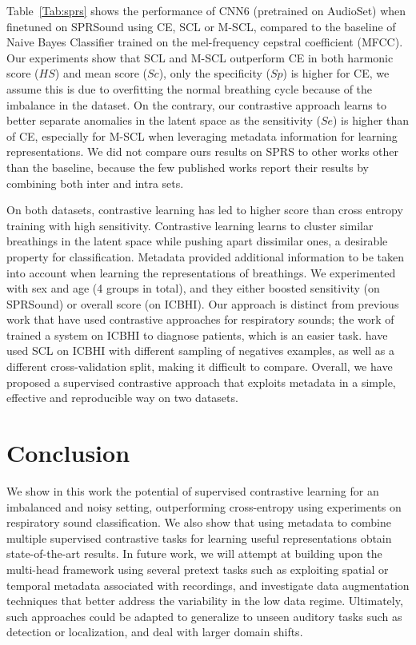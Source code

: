 \documentclass{article}
\begin{document}
\begin{sloppy}
Table~\ref{Tab:sprs} shows the performance of CNN6 (pretrained on AudioSet) when finetuned on SPRSound using CE, SCL or M-SCL, compared to the baseline of Naive Bayes Classifier trained on the mel-frequency cepstral coefficient (MFCC). Our experiments show that SCL and M-SCL outperform CE in both harmonic score ($HS$) and mean score ($Sc$), only the specificity ($Sp$) is higher for CE, we assume this is due to overfitting the normal breathing cycle because of the imbalance in the dataset. On the contrary, our contrastive approach learns to better separate anomalies in the latent space as the sensitivity ($Se$) is higher than of CE, especially for M-SCL when leveraging metadata information for learning representations. We did not compare ours results on SPRS to other works other than the baseline, because the few published works report their results by combining both inter and intra sets.

On both datasets, contrastive learning has led to higher score than cross entropy training with high sensitivity. Contrastive learning learns to cluster similar breathings in the latent space while pushing apart dissimilar ones, a desirable property for classification. Metadata provided additional information to be taken into account when learning the representations of breathings. We experimented with sex and age (4 groups in total), and they either boosted sensitivity (on SPRSound) or overall score (on ICBHI). Our approach is distinct from previous work that have used contrastive approaches for respiratory sounds; the work of~\cite{clhls} trained a system on ICBHI to diagnose patients, which is an easier task. \cite{9414385} have used SCL on ICBHI with different sampling of negatives examples, as well as a different cross-validation split, making it difficult to compare. Overall, we have proposed a supervised contrastive approach that exploits metadata in a simple, effective and reproducible way on two datasets. 

\section{Conclusion}
\label{sec:end}

We show in this work the potential of supervised contrastive learning for an imbalanced and noisy setting, outperforming cross-entropy using experiments on respiratory sound classification. We also show that using metadata to combine multiple supervised contrastive tasks for learning useful representations obtain state-of-the-art results.
In future work, we will attempt at building upon the multi-head framework using several pretext tasks such as exploiting spatial or temporal metadata associated with recordings, and investigate data augmentation techniques that better address the variability in the low data regime. Ultimately, such approaches could be adapted to generalize to unseen auditory tasks such as detection or localization, and deal with larger domain shifts.


\end{sloppy}
\end{document}
